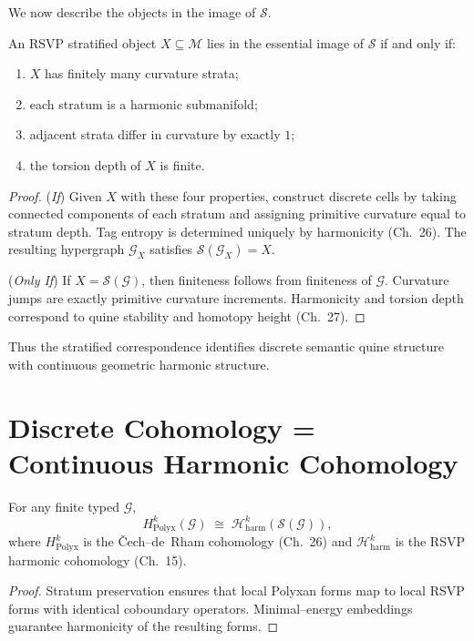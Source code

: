 We now describe the objects in the image of $\mathcal{S}$.

\begin{theorem}
\label{thm:28-essentialimage}
An RSVP stratified object $X\subseteq\mathcal{M}$
lies in the essential image of $\mathcal{S}$ if and only if:
\begin{enumerate}
\item $X$ has finitely many curvature strata;
\item each stratum is a harmonic submanifold;
\item adjacent strata differ in curvature by exactly $1$;
\item the torsion depth of $X$ is finite.
\end{enumerate}
\end{theorem}

\begin{proof}
(\emph{If})  
Given $X$ with these four properties, construct discrete cells by taking
connected components of each stratum and assigning primitive curvature equal to
stratum depth.
Tag entropy is determined uniquely by harmonicity (Ch.~26).
The resulting hypergraph $\mathcal{G}_X$ satisfies
$\mathcal{S}(\mathcal{G}_X)=X$.

(\emph{Only If})  
If $X=\mathcal{S}(\mathcal{G})$,
then finiteness follows from finiteness of $\mathcal{G}$.
Curvature jumps are exactly primitive curvature increments.
Harmonicity and torsion depth correspond to quine stability
and homotopy height (Ch.~27).
\end{proof}

Thus the stratified correspondence identifies discrete semantic quine structure
with continuous geometric harmonic structure.

\section{Discrete Cohomology = Continuous Harmonic Cohomology}

\begin{theorem}
\label{thm:28-cohom}
For any finite typed $\mathcal{G}$,
\[
H^k_{\mathrm{Polyx}}(\mathcal{G})
  \;\cong\;
\mathcal{H}^k_{\mathrm{harm}}(\mathcal{S}(\mathcal{G})),
\]
where $H^k_{\mathrm{Polyx}}$ is the Čech--de~Rham cohomology (Ch.~26)
and $\mathcal{H}^k_{\mathrm{harm}}$ is the RSVP harmonic cohomology
(Ch.~15).
\end{theorem}

\begin{proof}
Stratum preservation ensures that local Polyxan forms map to local RSVP forms
with identical coboundary operators.
Minimal--energy embeddings guarantee harmonicity of the resulting forms.
\end{proof}

